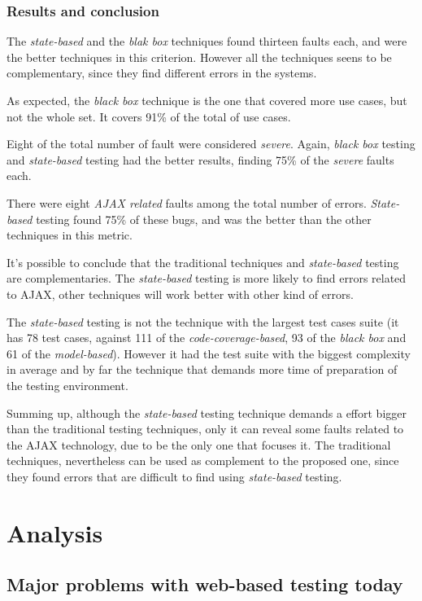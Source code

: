 \documentclass[a4paper]{article}
\begin{document}
\subsubsection{Results and conclusion}

The \emph{state-based} and the \emph{blak box} techniques found thirteen faults each, and were the better techniques in this criterion.
However all the techniques seens to be complementary, since they find different errors in the systems.

As expected, the \emph{black box} technique is the one that covered more use cases, but not the whole set.
It covers 91\% of the total of use cases.

Eight of the total number of fault were considered \emph{severe}. Again, \emph{black box} testing and \emph{state-based} testing had the better results, finding 75\% of the \emph{severe} faults each.

There were eight \emph{AJAX related} faults among the total number of errors. 
\emph{State-based} testing found 75\% of these bugs, and was the better than the other techniques in this metric.

It's possible to conclude that the traditional techniques and \emph{state-based} testing are complementaries.
The \emph{state-based} testing is more likely to find errors related to AJAX, other techniques will work better with other kind of errors.

The \emph{state-based} testing is not the technique with the largest test cases suite (it has 78 test cases, against 111 of the \emph{code-coverage-based}, 93 of the \emph{black box} and 61 of the \emph{model-based}).
However it had the test suite with the biggest complexity in average and by far the technique that demands more time of preparation of the testing environment.

Summing up, although the \emph{state-based} testing technique demands a effort bigger than the traditional testing techniques, only it can reveal some faults related to the AJAX technology, due to be the only one that focuses it.
The traditional techniques, nevertheless can be used as complement to the proposed one, since they found errors that are difficult to find using \emph{state-based} testing.


\section{Analysis}

\subsection{Major problems with web-based testing today}
\end{document}
